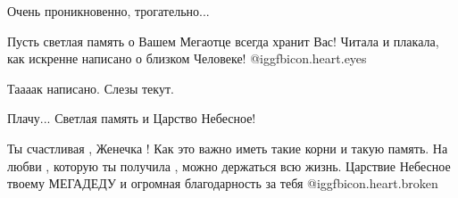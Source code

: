 \begin{itemize}
Очень проникновенно, трогательно...

Пусть светлая память о Вашем Мегаотце всегда хранит Вас!
Читала и плакала, как искренне написано о близком Человеке! @igg{fbicon.heart.eyes} 

Таааак написано. Слезы текут.

Плачу... Светлая память и Царство Небесное!


Ты счастливая , Женечка ! Как это важно иметь такие корни и такую память.  На
любви , которую ты получила , можно держаться всю жизнь.  Царствие Небесное
твоему МЕГАДЕДУ и огромная благодарность за тебя  @igg{fbicon.heart.broken} 

\end{itemize} %
